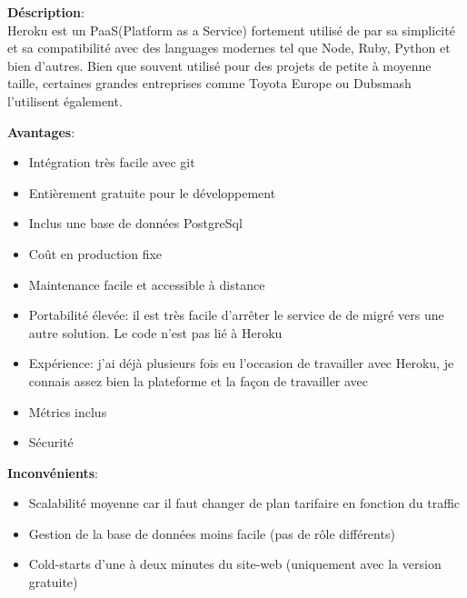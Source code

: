 \newpage
{}

\textbf{Déscription}: \\ Heroku est un PaaS(Platform as a Service) fortement utilisé de par sa simplicité et sa compatibilité avec des languages modernes tel que Node, Ruby, Python et bien d'autres.
\newpara
Bien que souvent utilisé pour des projets de petite à moyenne taille, certaines grandes entreprises comme Toyota Europe ou Dubsmash l'utilisent également.

\newpara
\textbf{Avantages}:
\begin{itemize}
  \item Intégration très facile avec git
  \item Entièrement gratuite pour le développement
  \item Inclus une base de données PostgreSql
  \item Coût en production fixe
  \item Maintenance facile et accessible à distance
  \item Portabilité élevée: il est très facile d'arrêter le service de de migré vers une autre solution. Le code n'est pas lié à Heroku
  \item Expérience: j'ai déjà plusieurs fois eu l'occasion de travailler avec Heroku, je connais assez bien la plateforme et la façon de travailler avec
  \item Métrics inclus
  \item Sécurité  
\end{itemize}

\newpara
\textbf{Inconvénients}:
\begin{itemize}
  \item Scalabilité moyenne car il faut changer de plan tarifaire en fonction du traffic
  \item Gestion de la base de données moins facile (pas de rôle différents)
  \item Cold-starts d'une à deux minutes du site-web (uniquement avec la version gratuite)
\end{itemize}

